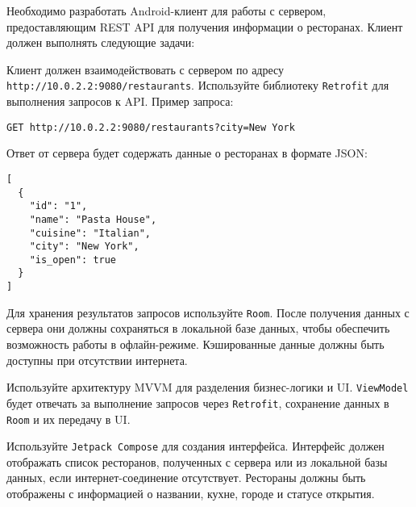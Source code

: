 
Необходимо разработать Android-клиент для работы с сервером, предоставляющим REST API для получения информации о ресторанах. Клиент должен выполнять следующие задачи:

Клиент должен взаимодействовать с сервером по адресу \texttt{http://10.0.2.2:9080/restaurants}. Используйте библиотеку \texttt{Retrofit} для выполнения запросов к API. Пример запроса:

\begin{verbatim}
GET http://10.0.2.2:9080/restaurants?city=New York
\end{verbatim}

Ответ от сервера будет содержать данные о ресторанах в формате JSON:

\begin{verbatim}
[
  {
    "id": "1",
    "name": "Pasta House",
    "cuisine": "Italian",
    "city": "New York",
    "is_open": true
  }
]
\end{verbatim}

Для хранения результатов запросов используйте \texttt{Room}. После получения данных с сервера они должны сохраняться в локальной базе данных, чтобы обеспечить возможность работы в офлайн-режиме. Кэшированные данные должны быть доступны при отсутствии интернета.

Используйте архитектуру MVVM для разделения бизнес-логики и UI. \texttt{ViewModel} будет отвечать за выполнение запросов через \texttt{Retrofit}, сохранение данных в \texttt{Room} и их передачу в UI.

Используйте \texttt{Jetpack Compose} для создания интерфейса. Интерфейс должен отображать список ресторанов, полученных с сервера или из локальной базы данных, если интернет-соединение отсутствует. Рестораны должны быть отображены с информацией о названии, кухне, городе и статусе открытия.

